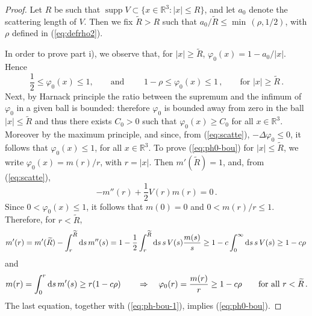 \documentclass[11pt]{article}
\newcommand{\rd}{{\rm d}}
\newcommand{\ph}{\varphi}
\newcommand{\bR}{{\mathbb R}}
\newcommand{\wt}{\widetilde}
\newcommand{\supp}{\operatorname{supp}}
\begin{document}
\begin{proof}
Let $R$ be such that $\supp V \subset \{ x \in \bR^3 : |x| \leq
R\}$, and let $a_0$ denote the scattering length of $V$. Then we fix
$\wt R >R$ such that $a_0/\wt R \leq \min \, (\rho, 1/2)$, with
$\rho$ defined in (\ref{eq:defrho2}).

\medskip

In order to prove part i), we observe that, for $|x| \geq \wt R$,
$\ph_0 (x) = 1 -a_0/|x|$. Hence
\begin{equation}\label{eq:ph-bou-1}
\frac{1}{2} \leq \ph_0 (x) \leq 1,  \qquad \text{and } \qquad 1-
\rho \leq \ph_0 (x) \leq 1 \, , \qquad \text{for } |x| \geq  \wt R\,
.
\end{equation}
Next, by Harnack principle the ratio between the supremum and the
infimum of $\ph_0$ in a given ball is bounded: therefore $\ph_0$ is
bounded away from zero in the ball $|x| \leq \wt R$ and thus there
exists $C_0 >0$ such that $\ph_0 (x) \geq C_0$ for all $x \in
\bR^3$. Moreover by the maximum principle, and since, from
(\ref{eq:scatte}), $-\Delta \ph_0 \leq 0$, it follows that $\ph_0
(x) \leq 1$, for all $x \in \bR^3$. To prove (\ref{eq:ph0-bou}) for
$|x| \leq \wt R$, we write $\ph_0 (x) = m(r)/r$, with $r=|x|$. Then
$m'(\wt R)= 1$, and, from (\ref{eq:scatte}),
\begin{equation}\label{eq:m''}
-m'' (r) + \frac{1}{2} V(r) m(r) =0 \,. \end{equation} Since $ 0<
\ph_0 (x) \leq 1$, it follows that $m(0) =0$ and $0< m(r)/r \leq 1$.
Therefore, for $r <\wt R$,
\begin{equation}
m'(r)=m'(\wt R) - \int_r^{\wt R} \rd s \, m'' (s) = 1 -
\frac{1}{2}\int_r^{\wt R} \rd s \, s \, V(s) \frac{m(s)}{s} \geq 1 -
c \int_0^{\infty} \rd s \, s \, V(s) \geq 1 - c \rho \,
\end{equation}
and
\begin{equation}
m(r) = \int_0^r \rd s \, m'(s) \geq r (1- c \rho) \qquad \Rightarrow
\quad  \ph_0 (r) = \frac{m(r)}{r} \geq 1-c \rho \qquad \text{for all
} r < \wt R\,.
\end{equation}
The last equation, together with (\ref{eq:ph-bou-1}), implies
(\ref{eq:ph0-bou}).

\medskip


\end{proof}
\end{document}
